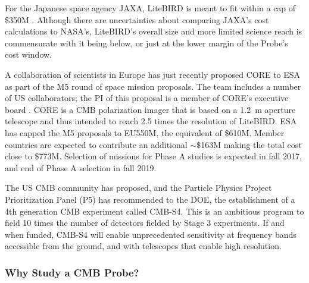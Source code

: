 For the Japanese space agency JAXA, LiteBIRD is meant to fit within a cap of \$350M . 
Although there are uncertainties about comparing JAXA's cost calculations to NASA's, LiteBIRD's overall size 
and more limited science reach is commensurate with it being below, or just at the lower margin of the Probe's
cost window. 

A collaboration of scientists in Europe has just recently proposed CORE to ESA as part of the M5 round 
of space mission proposals. 
The team includes a number of US collaborators; the PI of this proposal is a member of 
CORE's executive board . CORE is a CMB polarization imager that is based on a 
1.2~m aperture telescope and thus intended to reach 2.5 times the resolution of LiteBIRD. ESA has 
capped the M5 proposals to EU550M, the equivalent of 
\$610M. Member countries are expected to contribute an additional $\sim$\$163M making the total 
cost close to \$773M. Selection of missions for Phase A studies is expected in fall 2017, and 
end of Phase A selection in fall 2019. 

The US CMB community has proposed, and the Particle Physics Project Prioritization Panel (P5) has recommended 
to the DOE, the establishment of a 4th generation CMB experiment called CMB-S4. This is an ambitious 
program to field 10 times the number of detectors fielded by Stage 3 experiments. If and when funded, 
CMB-S4 will enable unprecedented sensitivity at frequency bands accessible from the ground, and 
with telescopes that enable high resolution. 


\vspace{-0.18in}

\subsubsection{Why Study a CMB Probe?} 

\vspace{-0.05in}

